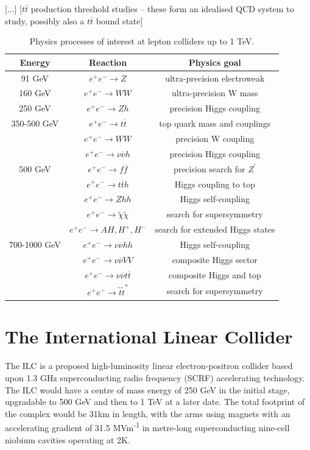 [...] [$t \overline{t}$ production threshold studies -- these form an idealised QCD system to study, possibly also a $t \overline{t}$ bound state]

\begin{table}[h]
\centering
	\begin{tabular}{ c | c | c }
	\hline \hline
	\textbf{Energy} & \textbf{Reaction} & \textbf{Physics goal} \\ \hline
	 91 GeV & $e^+ e^- \rightarrow Z$ & ultra-precision electroweak \\ \hline
	 160 GeV & $e^+ e^- \rightarrow WW$ & ultra-precision W mass \\ \hline
	 250 GeV & $e^+ e^- \rightarrow Zh$ & precision Higgs coupling \\ \hline
	 350-500 GeV & $e^+ e^- \rightarrow t\overline{t}$ & top quark mass and couplings \\
	   & $e^+ e^- \rightarrow WW$ & precision W coupling \\
	   & $e^+ e^- \rightarrow \nu \overline{\nu} h$ & precision Higgs coupling \\ \hline
	 500 GeV & $e^+ e^- \rightarrow f \overline{f}$ & precision search for $Z^\prime$ \\
	   & $e^+ e^- \rightarrow t \overline{t}h$ & Higgs coupling to top \\
	   & $e^+ e^- \rightarrow Zhh$ & Higgs self-coupling \\
	   & $e^+ e^- \rightarrow \widetilde{\chi} \widetilde{\chi}$ & search for supersymmetry \\
	   & $e^+ e^- \rightarrow AH, H^+, H^-$ & search for extended Higgs states \\ \hline
	 700-1000 GeV & $e^+ e^- \rightarrow \nu \overline{\nu} hh$ & Higgs self-coupling \\
	   & $e^+ e^- \rightarrow \nu \overline{\nu} VV$ & composite Higgs sector \\
	   & $e^+ e^- \rightarrow  \nu \overline{\nu} t \overline{t}$ & composite Higgs and top \\
	   & $e^+ e^- \rightarrow \tilde{t} \tilde{t}^*$ & search for supersymmetry \\ \hline
	\end{tabular}
	\caption{Physics processes of interest at lepton colliders up to 1 TeV.}
	\label{table:colliders/physics-goals}
\end{table}

\section{The International Linear Collider}
The \acrfull{ILC} is a proposed high-luminosity linear electron-positron collider based upon 1.3 GHz superconducting radio frequency (\acrshort{SCRF}) accelerating technology. The ILC would have a centre of mass energy of 250 GeV in the initial stage, upgradable to 500 GeV and then to 1 TeV at a later date. The total footprint of the complex would be 31km in length, with the arms using magnets with an accelerating gradient of 31.5 MVm\textsuperscript{-1} in metre-long superconducting nine-cell niobium cavities operating at 2K.

